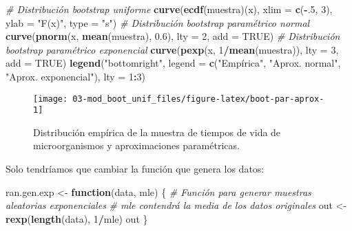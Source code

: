 \documentclass[]{book}
\newenvironment{Shaded}{\begin{snugshade}}{\end{snugshade}}
\newcommand{\KeywordTok}[1]{\textcolor[rgb]{0.13,0.29,0.53}{\textbf{#1}}}
\newcommand{\DataTypeTok}[1]{\textcolor[rgb]{0.13,0.29,0.53}{#1}}
\newcommand{\DecValTok}[1]{\textcolor[rgb]{0.00,0.00,0.81}{#1}}
\newcommand{\FloatTok}[1]{\textcolor[rgb]{0.00,0.00,0.81}{#1}}
\newcommand{\StringTok}[1]{\textcolor[rgb]{0.31,0.60,0.02}{#1}}
\newcommand{\CommentTok}[1]{\textcolor[rgb]{0.56,0.35,0.01}{\textit{#1}}}
\newcommand{\OtherTok}[1]{\textcolor[rgb]{0.56,0.35,0.01}{#1}}
\newcommand{\ControlFlowTok}[1]{\textcolor[rgb]{0.13,0.29,0.53}{\textbf{#1}}}
\newcommand{\OperatorTok}[1]{\textcolor[rgb]{0.81,0.36,0.00}{\textbf{#1}}}
\newcommand{\NormalTok}[1]{#1}
\theoremstyle{break}
\theoremstyle{definition}
\theoremstyle{definition}
\theoremstyle{definition}
\theoremstyle{remark}
\begin{document}
\begin{Shaded}
\begin{Highlighting}[]
\CommentTok{# Distribución bootstrap uniforme}
\KeywordTok{curve}\NormalTok{(}\KeywordTok{ecdf}\NormalTok{(muestra)(x), }\DataTypeTok{xlim =} \KeywordTok{c}\NormalTok{(}\OperatorTok{-}\NormalTok{.}\DecValTok{5}\NormalTok{, }\DecValTok{3}\NormalTok{), }\DataTypeTok{ylab =} \StringTok{"F(x)"}\NormalTok{, }\DataTypeTok{type =} \StringTok{"s"}\NormalTok{)}
\CommentTok{# Distribución bootstrap paramétrico normal}
\KeywordTok{curve}\NormalTok{(}\KeywordTok{pnorm}\NormalTok{(x, }\KeywordTok{mean}\NormalTok{(muestra), }\FloatTok{0.6}\NormalTok{), }\DataTypeTok{lty =} \DecValTok{2}\NormalTok{, }\DataTypeTok{add =} \OtherTok{TRUE}\NormalTok{)}
\CommentTok{# Distribución bootstrap paramétrico exponencial}
\KeywordTok{curve}\NormalTok{(}\KeywordTok{pexp}\NormalTok{(x, }\DecValTok{1}\OperatorTok{/}\KeywordTok{mean}\NormalTok{(muestra)), }\DataTypeTok{lty =} \DecValTok{3}\NormalTok{, }\DataTypeTok{add =} \OtherTok{TRUE}\NormalTok{)}
\KeywordTok{legend}\NormalTok{(}\StringTok{"bottomright"}\NormalTok{, }\DataTypeTok{legend =} \KeywordTok{c}\NormalTok{(}\StringTok{"Empírica"}\NormalTok{, }\StringTok{"Aprox. normal"}\NormalTok{, }\StringTok{"Aprox. exponencial"}\NormalTok{), }\DataTypeTok{lty =} \DecValTok{1}\OperatorTok{:}\DecValTok{3}\NormalTok{)}
\end{Highlighting}
\end{Shaded}

\begin{figure}[!htb]

{\centering \texttt{[image: 03-mod\_boot\_unif\_files/figure-latex/boot-par-aprox-1]} 

}

\caption{Distribución empírica de la muestra de tiempos de vida de microorganismos y aproximaciones paramétricas.}\label{fig:boot-par-aprox}
\end{figure}

Solo tendríamos que cambiar la función que genera los datos:

\begin{Shaded}
\begin{Highlighting}[]
\NormalTok{ran.gen.exp <-}\StringTok{ }\ControlFlowTok{function}\NormalTok{(data, mle) \{}
    \CommentTok{# Función para generar muestras aleatorias exponenciales}
    \CommentTok{# mle contendrá la media de los datos originales}
\NormalTok{    out <-}\StringTok{ }\KeywordTok{rexp}\NormalTok{(}\KeywordTok{length}\NormalTok{(data), }\DecValTok{1}\OperatorTok{/}\NormalTok{mle)}
\NormalTok{    out}
\NormalTok{\}}
\end{Highlighting}
\end{Shaded}
\end{document}
